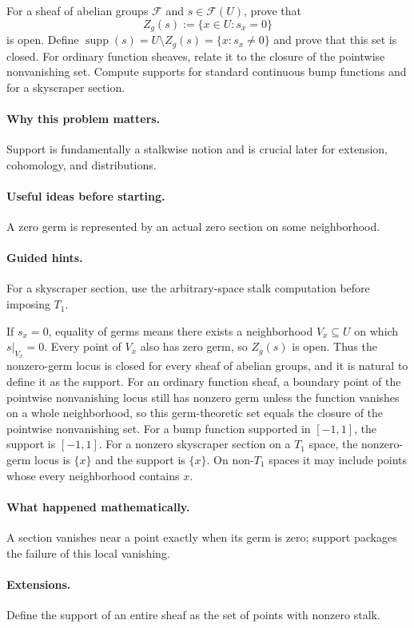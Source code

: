\begin{problem}
For a sheaf of abelian groups $\mathcal F$ and $s\in\mathcal F(U)$, prove that
\[
Z_g(s):=\{x\in U:s_x=0\}
\]
is open. Define $\operatorname{supp}(s)=U\setminus Z_g(s)=\{x:s_x\neq0\}$ and prove that this set is closed.  For ordinary function sheaves, relate it to the closure of the pointwise nonvanishing set. Compute supports for standard continuous bump functions and for a skyscraper section.
\end{problem}

\paragraph{Why this problem matters.}
Support is fundamentally a stalkwise notion and is crucial later for extension, cohomology, and distributions.

\paragraph{Useful ideas before starting.}
A zero germ is represented by an actual zero section on some neighborhood.

\paragraph{Guided hints.}
For a skyscraper section, use the arbitrary-space stalk computation before imposing $T_1$.

\ifdefined\FullProblemDossiers
\begin{solution}
If $s_x=0$, equality of germs means there exists a neighborhood $V_x\subseteq U$ on which $s|_{V_x}=0$. Every point of $V_x$ also has zero germ, so $Z_g(s)$ is open. Thus the nonzero-germ locus is closed for every sheaf of abelian groups, and it is natural to define it as the support.  For an ordinary function sheaf, a boundary point of the pointwise nonvanishing locus still has nonzero germ unless the function vanishes on a whole neighborhood, so this germ-theoretic set equals the closure of the pointwise nonvanishing set. For a bump function supported in $[-1,1]$, the support is $[-1,1]$. For a nonzero skyscraper section on a $T_1$ space, the nonzero-germ locus is $\{x\}$ and the support is $\{x\}$. On non-$T_1$ spaces it may include points whose every neighborhood contains $x$.
\end{solution}

\paragraph{What happened mathematically.}
A section vanishes near a point exactly when its germ is zero; support packages the failure of this local vanishing.

\paragraph{Extensions.}
Define the support of an entire sheaf as the set of points with nonzero stalk.
\fi

